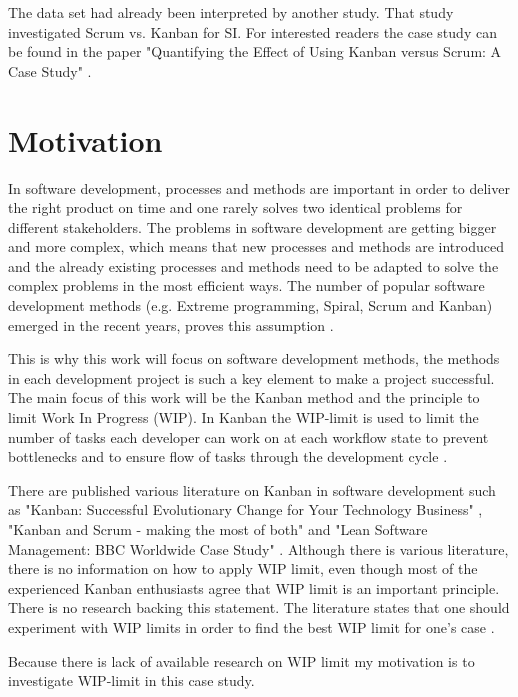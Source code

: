 \documentclass[UKenglish]{ifimaster}  %
\begin{document}
The data set had already been interpreted by another study. That study investigated Scrum vs. Kanban for SI. For interested readers the case study can be found in the paper "Quantifying the Effect of Using Kanban versus Scrum: A Case Study" \parencite{Dag}. 

\section{Motivation}
In software development, processes and methods are important in order to deliver the right product on time and one rarely solves two identical problems for different stakeholders. The problems in software development are getting bigger and more complex, which means that new processes and methods are introduced and the already existing processes and methods need to be adapted to solve the complex problems in the most efficient ways.  The number of popular software development methods  (e.g. Extreme programming, Spiral, Scrum and Kanban) emerged in the recent years, proves this assumption \parencite{gandomani2013important} \parencite{ikonen2010exploring}.

This is why this work will focus on software development methods, the methods in each development project is such a key element to make a project successful. The main focus of this work will be the Kanban method and the principle to limit Work In Progress (WIP). In Kanban the WIP-limit is used to  limit the number of tasks each developer can work on at each workflow state to prevent bottlenecks and to ensure flow of tasks through the development cycle \parencite{gandomani2013important} \parencite{ikonen2010exploring}.

There are published various literature on Kanban in software development such as "Kanban: Successful Evolutionary Change for Your Technology Business" \parencite{0984521402}, "Kanban and Scrum - making the most of both"  \parencite{Kniberg} and "Lean Software Management: BBC Worldwide Case Study" \parencite{Joyce}. Although there is various literature, there is no information on how to apply WIP limit, even though most of the experienced Kanban enthusiasts agree that WIP limit is an important principle.  There is no research backing this statement.  The literature states that one should experiment with WIP limits in order to find the best WIP limit for one's case \parencite{Ikonen} \parencite{Kniberg}.

Because there is lack of available research on WIP limit my motivation is to investigate WIP-limit in this case study.
\end{document}
